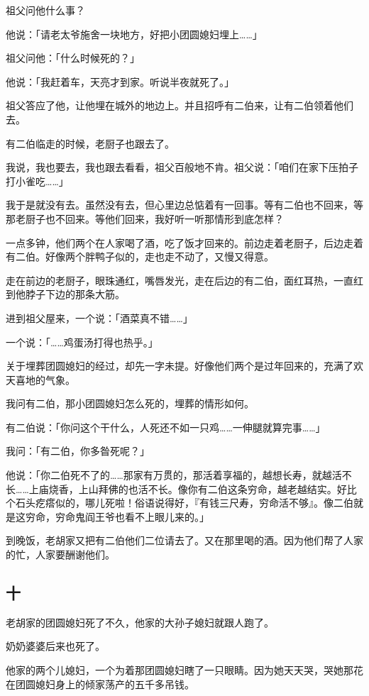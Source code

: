 \documentclass[UTF8]{ctexart}
\begin{document}
祖父问他什么事？

他说：「请老太爷施舍一块地方，好把小团圆媳妇埋上……」

祖父问他：「什么时候死的？」

他说：「我赶着车，天亮才到家。听说半夜就死了。」

祖父答应了他，让他埋在城外的地边上。并且招呼有二伯来，让有二伯领着他们去。

有二伯临走的时候，老厨子也跟去了。

我说，我也要去，我也跟去看看，祖父百般地不肯。祖父说：「咱们在家下压拍子打小雀吃……」

我于是就没有去。虽然没有去，但心里边总惦着有一回事。等有二伯也不回来，等那老厨子也不回来。等他们回来，我好听一听那情形到底怎样？

一点多钟，他们两个在人家喝了酒，吃了饭才回来的。前边走着老厨子，后边走着有二伯。好像两个胖鸭子似的，走也走不动了，又慢又得意。

走在前边的老厨子，眼珠通红，嘴唇发光，走在后边的有二伯，面红耳热，一直红到他脖子下边的那条大筋。

进到祖父屋来，一个说：「酒菜真不错……」

一个说：「……鸡蛋汤打得也热乎。」

关于埋葬团圆媳妇的经过，却先一字未提。好像他们两个是过年回来的，充满了欢天喜地的气象。

我问有二伯，那小团圆媳妇怎么死的，埋葬的情形如何。

有二伯说：「你问这个干什么，人死还不如一只鸡……一伸腿就算完事……」

我问：「有二伯，你多昝死呢？」

他说：「你二伯死不了的……那家有万贯的，那活着享福的，越想长寿，就越活不长……上庙烧香，上山拜佛的也活不长。像你有二伯这条穷命，越老越结实。好比个石头疙瘩似的，哪儿死啦！俗语说得好，『有钱三尺寿，穷命活不够』。像二伯就是这穷命，穷命鬼阎王爷也看不上眼儿来的。」

到晚饭，老胡家又把有二伯他们二位请去了。又在那里喝的酒。因为他们帮了人家的忙，人家要酬谢他们。

\subsection{十}

老胡家的团圆媳妇死了不久，他家的大孙子媳妇就跟人跑了。

奶奶婆婆后来也死了。

他家的两个儿媳妇，一个为着那团圆媳妇瞎了一只眼睛。因为她天天哭，哭她那花在团圆媳妇身上的倾家荡产的五千多吊钱。
\end{document}
